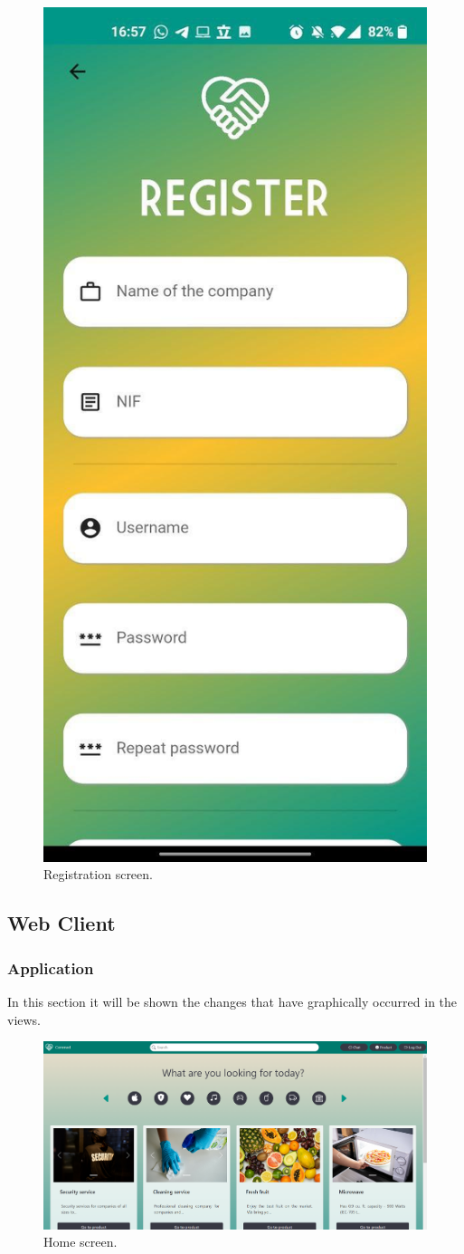 \documentclass[./main.tex]{subfiles}
\begin{document}
\begin{figure}[H]
\centering
\includegraphics[width=0.5\linewidth]{img/mobile-screen-1.jpg}
\caption{Registration screen.}
\label{fig:mobile-screen-1}
\end{figure}


\subsection{Web Client}
\subsubsection{Application}
In this section it will be shown the changes that have graphically occurred in the views.
\begin{figure}[H]
  \centering
  \includegraphics[width=0.5\linewidth]{img/webclient_2.png}
  \caption{Home screen.}
  \label{fig:webclient-screen-1}
\end{figure}
\end{document}
